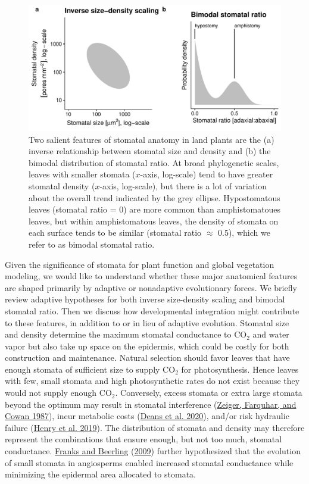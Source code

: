 \documentclass[
  10pt,
]{article}
\begin{document}
\begin{figure}[ht]
\includegraphics[width=\textwidth]{../figures/concepts.pdf}
\caption{Two salient features of stomatal anatomy in land plants are the (a) inverse relationship between stomatal size and density and (b) the bimodal distribution of stomatal ratio. At broad phylogenetic scales, leaves with smaller stomata ($x$-axis, log-scale) tend to have greater stomatal density  ($x$-axis, log-scale), but there is a lot of variation about the overall trend indicated by the grey ellipse. Hypostomatous leaves (stomatal ratio = 0) are more common than amphistomatoues leaves, but within amphistomatous leaves, the density of stomata on each surface tends to be similar (stomatal ratio $\approx$ 0.5), which we refer to as bimodal stomatal ratio.}
\label{fig:concepts}
\end{figure}

Given the significance of stomata for plant function and global vegetation modeling, we would like to understand whether these major anatomical features are shaped primarily by adaptive or nonadaptive evolutionary forces. We briefly review adaptive hypotheses for both inverse size-density scaling and bimodal stomatal ratio. Then we discuss how developmental integration might contribute to these features, in addition to or in lieu of adaptive evolution. Stomatal size and density determine the maximum stomatal conductance to CO\(_2\) and water vapor but also take up space on the epidermis, which could be costly for both construction and maintenance. Natural selection should favor leaves that have enough stomata of sufficient size to supply CO\(_2\) for photosynthesis. Hence leaves with few, small stomata and high photosynthetic rates do not exist because they would not supply enough CO\(_2\). Conversely, excess stomata or extra large stomata beyond the optimum may result in stomatal interference (\protect\hyperlink{ref-zeiger_stomatal_1987}{Zeiger, Farquhar, and Cowan 1987}), incur metabolic costs (\protect\hyperlink{ref-deans_optimization_2020}{Deans et al. 2020}), and/or risk hydraulic failure (\protect\hyperlink{ref-henry_stomatal_2019}{Henry et al. 2019}). The distribution of stomata and density may therefore represent the combinations that ensure enough, but not too much, stomatal conductance. \protect\hyperlink{ref-franks_maximum_2009}{Franks and Beerling} (\protect\hyperlink{ref-franks_maximum_2009}{2009}) further hypothesized that the evolution of small stomata in angiosperms enabled increased stomatal conductance while minimizing the epidermal area allocated to stomata.
\end{document}

